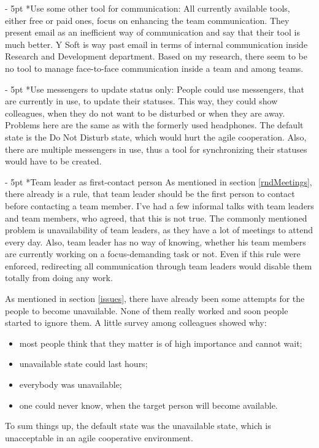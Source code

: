\documentclass[11pt,singleside]{myfithesis2}
\makeatletter
\renewcommand\paragraph{
   \vspace{-10pt}
   \@startsection{paragraph}{4}{0mm}
      {\baselineskip}
      {- 5pt}
      {\normalfont\normalsize\bfseries}
}
\makeatother
\begin{document}
\paragraph*{Use some other tool for communication: } All currently available tools, either free or paid ones, focus on enhancing the team communication. They present email as an inefficient way of communication and say that their tool is much better. Y Soft is way past email in terms of internal communication inside Research and Development department. Based on my research, there seem to be no tool to manage face-to-face communication inside a team and among teams.

\paragraph*{Use messengers to update status only: } People could use messengers, that are currently in use, to update their statuses. This way, they could show colleagues, when they do not want to be disturbed or when they are away. Problems here are the same as with the formerly used headphones. The default state is the Do Not Disturb state, which would hurt the agile cooperation. Also, there are multiple messengers in use, thus a tool for synchronizing their statuses would have to be created.

\paragraph*{Team leader as first-contact person} As mentioned in section \ref{rndMeetings}, there already is a rule, that team leader should be the first person to contact before contacting a team member. I've had a few informal talks with team leaders and team members, who agreed, that this is not true. The commonly mentioned problem is unavailability of team leaders, as they have a lot of meetings to attend every day. Also, team leader has no way of knowing, whether his team members are currently working on a focus-demanding task or not. Even if this rule were enforced, redirecting all communication through team leaders would disable them totally from doing any work.

As mentioned in section \ref{issues}, there have already been some attempts for the people to become unavailable. None of them really worked and soon people started to ignore them. A little survey among colleagues showed why:
\begin{itemize}
	\item most people think that they matter is of high importance and cannot wait;
	\item unavailable state could last hours;
	\item everybody was unavailable;
	\item one could never know, when the target person will become available.
\end{itemize}
To sum things up, the default state was the unavailable state, which is unacceptable in an agile cooperative environment.
\end{document}
